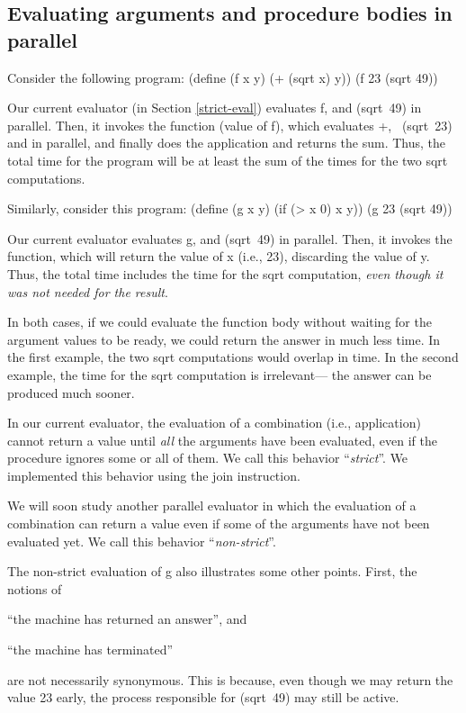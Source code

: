 \subsection{Evaluating arguments and procedure bodies in parallel}

Consider the following program:
\beginlisp
(define (f x y) (+ (sqrt x) y))
\null
(f 23 (sqrt 49))
\endlisp

 Our current evaluator (in Section \ref{strict-eval}) evaluates {\cf
f}, {} and \mbox{\cf (sqrt 49)} in parallel.  Then, it invokes
the function (value of {\cf f}), which evaluates {\cf +}, \mbox{\cf
(sqrt 23)} and {} in parallel, and finally does the application
and returns the sum.  Thus, the total time for the program will be at
least the sum of the times for the two {\cf sqrt} computations.

Similarly, consider this program:
\beginlisp
(define (g x y)
    (if (> x 0)
        x
        y))
\null
(g 23 (sqrt 49))
\endlisp

 Our current evaluator evaluates {\cf g}, {} and \mbox{\cf (sqrt
49)} in parallel.  Then, it invokes the function, which will return
the value of {\cf x} (i.e., 23), discarding the value of {\cf y}.
Thus, the total time includes the time for the {\cf sqrt} computation,
{\em even though it was not needed for the result\/}.

In both cases, if we could evaluate the function body without waiting
for the argument values to be ready, we could return the answer in
much less time.  In the first example, the two {\cf sqrt} computations
would overlap in time.  In the second example, the time for the {\cf
sqrt} computation is irrelevant--- the answer can be produced much
sooner.

In our current evaluator, the evaluation of a combination (i.e.,
application) cannot return a value until {\em all\/} the arguments
have been evaluated, even if the procedure ignores some or all of
them.  We call this behavior ``{\em strict\/}''.  We implemented this
behavior using the {\cf join} instruction.

We will soon study another parallel evaluator in which the evaluation
of a combination can return a value even if some of the arguments have
not been evaluated yet.  We call this behavior ``{\em non-strict\/}''.

The non-strict evaluation of {\cf g} also illustrates some other
points.  First, the notions of

\begin{tightlist}
 \item ``the machine has returned an answer'', and
 \item ``the machine has terminated''
\end{tightlist}
 are not necessarily synonymous.  This is because, even though we may
return the value 23 early, the process responsible for \mbox{\cf (sqrt
49)} may still be active.

